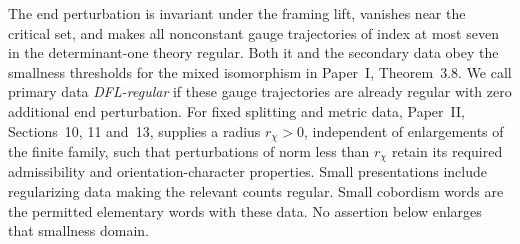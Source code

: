 \documentclass[11pt]{amsart}
\theoremstyle{definition}
\theoremstyle{remark}
\theoremstyle{plain}
\begin{document}
The end perturbation is invariant under the framing lift, vanishes
near the critical set, and makes all nonconstant gauge trajectories
of index at most seven in the determinant-one theory regular. Both
it and the secondary data obey the smallness thresholds for the
mixed isomorphism in Paper~I, Theorem~3.8. We call primary data
\emph{DFL-regular} if these gauge trajectories are already regular
with zero additional end perturbation. For fixed splitting
and metric data, Paper~II, Sections~10, 11 and~13, supplies a radius
$r_\chi>0$, independent of enlargements of the finite family, such
that perturbations of norm less than $r_\chi$ retain its required
admissibility and orientation-character properties. Small
presentations include regularizing data making the relevant counts
regular. Small cobordism words are the permitted elementary words
with these data. No assertion below enlarges that smallness domain.
\end{document}
